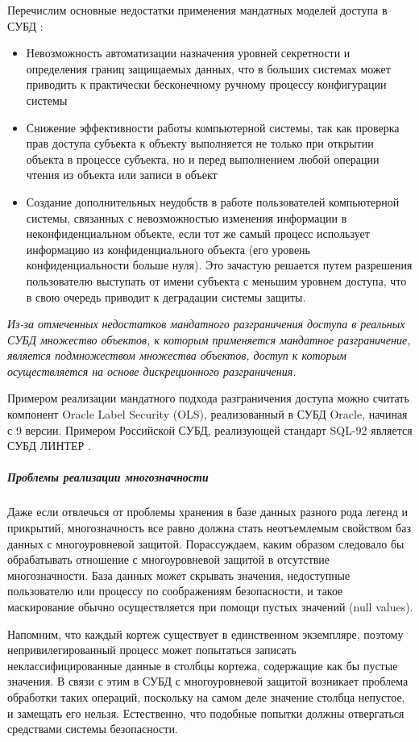 Перечислим основные недостатки применения мандатных моделей доступа в СУБД \autocite{Skakun}:
\begin{itemize}
    \item Невозможность автоматизации назначения уровней секретности и определения границ защищаемых данных,
    что в больших системах может приводить к практически бесконечному ручному процессу конфигурации системы
    \item Снижение эффективности работы компьютерной системы, так как проверка прав доступа субъекта к объекту
    выполняется не только при открытии объекта в процессе субъекта, но и перед выполнением любой операции
    чтения из объекта или записи в объект
    \item Создание дополнительных неудобств в работе пользователей компьютерной системы, связанных с
    невозможностью изменения информации в неконфиденциальном объекте, если тот же самый процесс использует
    информацию из конфиденциального объекта (его уровень конфиденциальности больше нуля). Это зачастую
    решается путем разрешения пользователю выступать от имени субъекта с меньшим уровнем доступа, что в
    свою очередь приводит к деградации системы защиты.
\end{itemize}

\textit{Из-за отмеченных недостатков мандатного разграничения доступа в реальных СУБД множество объектов, к которым
применяется мандатное разграничение, является подмножеством множества объектов, доступ к которым осуществляется
на основе дискреционного разграничения.}

Примером реализации мандатного подхода разграничения доступа можно считать компонент Oracle Label Security (OLS),
реализованный в СУБД Oracle, начиная с 9 версии. Примером Российской СУБД, реализующей стандарт SQL-92 является
СУБД ЛИНТЕР \autocite{Skakun}.

\subparagraph{Проблемы реализации многозначности}

Даже если отвлечься от проблемы хранения в базе данных разного рода легенд и прикрытий, многозначность все равно должна стать неотъемлемым свойством баз данных с многоуровневой защитой. Порассуждаем, каким образом следовало бы обрабатывать отношение с многоуровневой защитой в отсутствие многозначности. База данных может скрывать значения, недоступные пользователю или процессу по соображениям безопасности, и такое маскирование обычно осуществляется при помощи пустых значений (null values).

Напомним, что каждый кортеж существует в единственном экземпляре, поэтому непривилегированный процесс может попытаться записать неклассифицированные данные в столбцы кортежа, содержащие как бы пустые значения. В связи с этим в СУБД с многоуровневой защитой возникает проблема обработки таких операций, поскольку на самом деле значение столбца непустое, и замещать его нельзя. Естественно, что подобные попытки должны отвергаться средствами системы безопасности.

